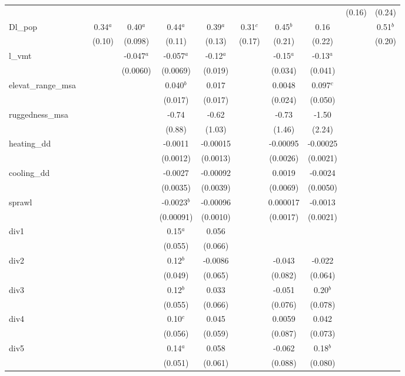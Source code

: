 \documentclass[]{article}
\begin{document}
\begin{tabular}{lcccccccccc}
 &  &  &  &  &  &  &  &  & (0.16) & (0.24) \\
Dl\_pop &  & 0.34$^a$ & 0.40$^a$ & 0.44$^a$ & 0.39$^a$ & 0.31$^c$ & 0.45$^b$ & 0.16 &  & 0.51$^b$ \\
 &  & (0.10) & (0.098) & (0.11) & (0.13) & (0.17) & (0.21) & (0.22) &  & (0.20) \\
l\_vmt &  &  & -0.047$^a$ & -0.057$^a$ & -0.12$^a$ &  & -0.15$^a$ & -0.13$^a$ &  &  \\
 &  &  & (0.0060) & (0.0069) & (0.019) &  & (0.034) & (0.041) &  &  \\
elevat\_range\_msa &  &  &  & 0.040$^b$ & 0.017 &  & 0.0048 & 0.097$^c$ &  &  \\
 &  &  &  & (0.017) & (0.017) &  & (0.024) & (0.050) &  &  \\
ruggedness\_msa &  &  &  & -0.74 & -0.62 &  & -0.73 & -1.50 &  &  \\
 &  &  &  & (0.88) & (1.03) &  & (1.46) & (2.24) &  &  \\
heating\_dd &  &  &  & -0.0011 & -0.00015 &  & -0.00095 & -0.00025 &  &  \\
 &  &  &  & (0.0012) & (0.0013) &  & (0.0026) & (0.0021) &  &  \\
cooling\_dd &  &  &  & -0.0027 & -0.00092 &  & 0.0019 & -0.0024 &  &  \\
 &  &  &  & (0.0035) & (0.0039) &  & (0.0069) & (0.0050) &  &  \\
sprawl &  &  &  & -0.0023$^b$ & -0.00096 &  & 0.000017 & -0.0013 &  &  \\
 &  &  &  & (0.00091) & (0.0010) &  & (0.0017) & (0.0021) &  &  \\
div1 &  &  &  & 0.15$^a$ & 0.056 &  &  &  &  &  \\
 &  &  &  & (0.055) & (0.066) &  &  &  &  &  \\
div2 &  &  &  & 0.12$^b$ & -0.0086 &  & -0.043 & -0.022 &  &  \\
 &  &  &  & (0.049) & (0.065) &  & (0.082) & (0.064) &  &  \\
div3 &  &  &  & 0.12$^b$ & 0.033 &  & -0.051 & 0.20$^b$ &  &  \\
 &  &  &  & (0.055) & (0.066) &  & (0.076) & (0.078) &  &  \\
div4 &  &  &  & 0.10$^c$ & 0.045 &  & 0.0059 & 0.042 &  &  \\
 &  &  &  & (0.056) & (0.059) &  & (0.087) & (0.073) &  &  \\
div5 &  &  &  & 0.14$^a$ & 0.058 &  & -0.062 & 0.18$^b$ &  &  \\
 &  &  &  & (0.051) & (0.061) &  & (0.088) & (0.080) &  &  \\

\end{tabular}
\end{document}
